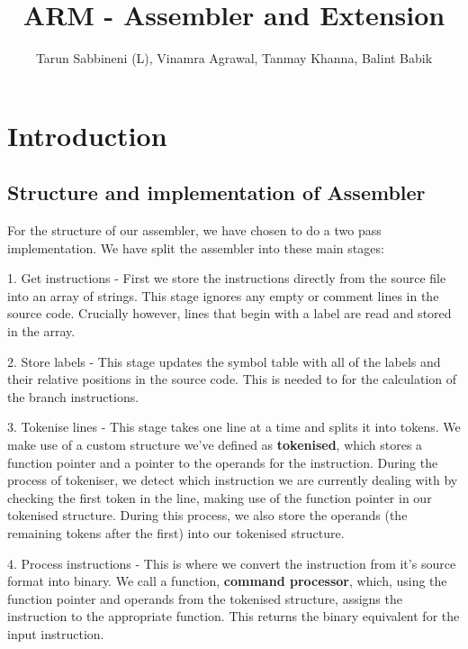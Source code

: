 \documentclass[11pt]{article}
\begin{document}
\title{ARM - Assembler and Extension}
\author{Tarun Sabbineni (L), Vinamra Agrawal, Tanmay Khanna, Balint Babik}

\maketitle

\section{Introduction}

\subsection{Structure and implementation of Assembler}

For the structure of our assembler, we have chosen to do a two pass implementation. We have split the assembler into these main stages: 

1. Get instructions - First we store the instructions directly from the source file into an array of strings. This stage ignores any empty or comment lines in the source code. Crucially however, lines that begin with a label are read and stored in the array. 

2. Store labels - This stage updates the symbol table with all of the labels and their relative positions in the source code. This is needed to for the calculation of the branch instructions.

3. Tokenise lines - This stage takes one line at a time and splits it into tokens. We make use of a custom structure we've defined as \textbf{tokenised}, which stores a function pointer and a pointer to the operands for the instruction. During the process of tokeniser, we detect which instruction we are currently dealing with by checking the first token in the line, making use of the function pointer in our tokenised structure. During this process, we also store the operands (the remaining tokens after the first) into our tokenised structure.

4. Process instructions - This is where we convert the instruction from it's source format into binary. We call a function, \textbf{command processor}, which, using the function pointer and operands from the tokenised structure, assigns the instruction to the appropriate function. This returns the binary equivalent for the input instruction.
\end{document}
